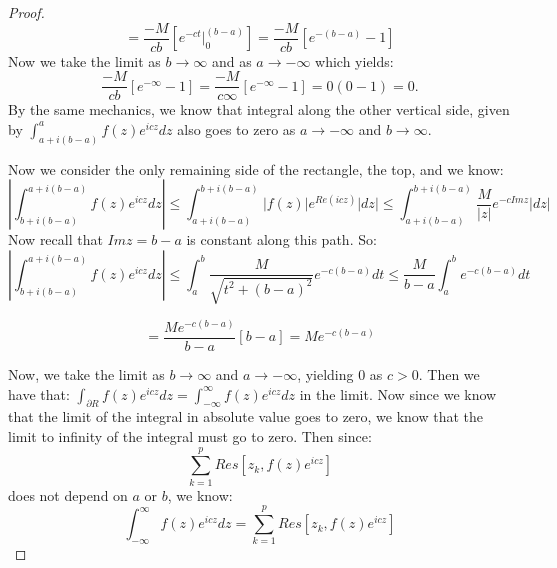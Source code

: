 \documentclass[10pt]{article}
\begin{document}
\begin{proof}
\[=\frac{-M}{cb} \left[e^{-ct}\Big|_0^{(b-a)}\right] = \frac{-M}{cb}[e^{-(b-a)} - 1]\]
Now we take the limit as $b \to \infty$ and as $a \to -\infty$ which yields: 
\[ \frac{-M}{cb}[e^{-\infty} - 1] = \frac{-M}{c\infty}[e^{-\infty} - 1] = 0(0-1) = 0.\]
By the same mechanics, we know that integral along the other vertical side, given by $\int_{a+i(b-a)}^{a} f(z)e^{icz} dz$ also goes to zero as $a \to -\infty$ and $b \to \infty$. 


Now we consider the only remaining side of the rectangle, the top, and we know: 
\[\left| \int_{b+i(b-a)}^{a+i(b-a)} f(z)e^{icz}dz \right| \leq \int_{a+i(b-a)}^{b+i(b-a)} |f(z)|e^{Re(icz)}|dz| \leq \int_{a+i(b-a)}^{b+i(b-a)} \frac{M}{|z|}e^{-cImz}|dz|\]
Now recall that $Imz = b-a$ is constant along this path. So:
\[\left| \int_{b+i(b-a)}^{a+i(b-a)} f(z)e^{icz}dz \right| \leq \int_{a}^{b} \frac{M}{\sqrt{t^2 + (b-a)^2}}e^{-c(b-a)}dt \leq \frac{M}{b-a}\int_{a}^{b} e^{-c(b-a)}dt\]

\[ =\frac{Me^{-c(b-a)}}{b-a}[b-a]= Me^{-c(b-a)}\]

Now, we take the limit as $b \to \infty$ and $a \to -\infty$, yielding $0$ as $c >0$. Then we have that: 
$\int_{\partial R} f(z)e^{icz}dz = \int_{-\infty}^{\infty} f(z)e^{icz}dz$
in the limit. Now since we know that the limit of the integral in absolute value goes to zero, we know that the limit to infinity of the integral must go to zero. Then since: 
\[\sum_{k = 1}^p Res[z_k,f(z)e^{icz}]\]
does not depend on $a$ or $b$, we know:
\[ \int_{-\infty}^{\infty} f(z)e^{icz}dz = \sum_{k = 1}^p Res[z_k,f(z)e^{icz}]\]

\end{proof}
\end{document}
